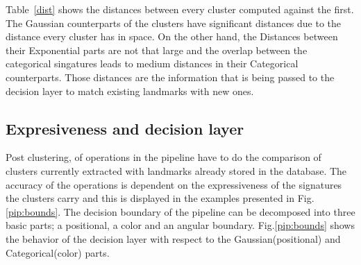 \documentclass[]{article}
\begin{document}
    Table~\ref{dist} shows the distances between every cluster computed against the first. The Gaussian counterparts of the clusters have significant distances due to the distance every cluster has in space. On the other hand, the Distances between their Exponential parts are not that large and the overlap between the categorical singatures leads to medium distances in their Categorical counterparts. Those distances are the information that is being passed to the decision layer to match existing landmarks with new ones. 

    \subsection{Expresiveness and decision layer}

    Post clustering, of operations in the pipeline have to do the comparison of clusters currently extracted with landmarks already stored in the database. The accuracy of the operations is dependent on the expressiveness of the signatures the clusters carry and this is displayed in the examples presented in Fig.\ref{pip:bounds}. The decision boundary of the pipeline can be decomposed into three basic parts; a positional, a color and an angular boundary. Fig.\ref{pip:bounds} shows the behavior of the decision layer with respect to the Gaussian(positional) and Categorical(color) parts. 
\end{document}

